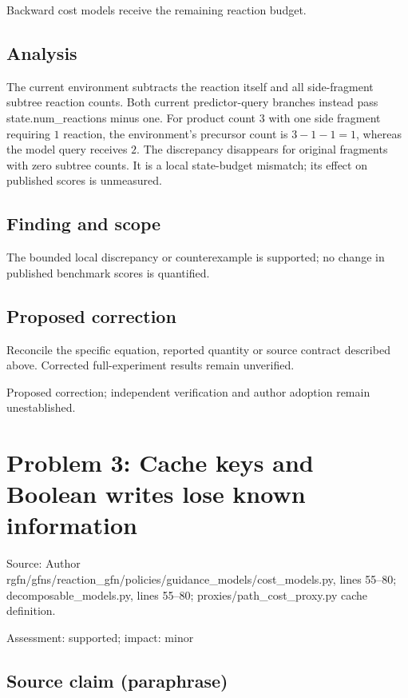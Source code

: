 \documentclass[11pt]{article}
\begin{document}
Backward cost models receive the remaining reaction budget.

\subsection*{Analysis}

The current environment subtracts the reaction itself and all side-fragment subtree reaction counts. Both current predictor-query branches instead pass state.num\_reactions minus one. For product count \(3\) with one side fragment requiring \(1\) reaction, the environment’s precursor count is \(3-1-1=1\), whereas the model query receives \(2\). The discrepancy disappears for original fragments with zero subtree counts. It is a local state-budget mismatch; its effect on published scores is unmeasured.

\subsection*{Finding and scope}

The bounded local discrepancy or counterexample is supported; no change in published benchmark scores is quantified.

\subsection*{Proposed correction}

Reconcile the specific equation, reported quantity or source contract described above. Corrected full-experiment results remain unverified.

Proposed correction; independent verification and author adoption remain unestablished.

\section*{Problem 3: Cache keys and Boolean writes lose known information}

Source: Author rgfn/gfns/reaction\_gfn/policies/guidance\_models/cost\_models.py, lines 55–80; decomposable\_models.py, lines 55–80; proxies/path\_cost\_proxy.py cache definition.

Assessment: supported; impact: minor

\subsection*{Source claim (paraphrase)}
\end{document}
